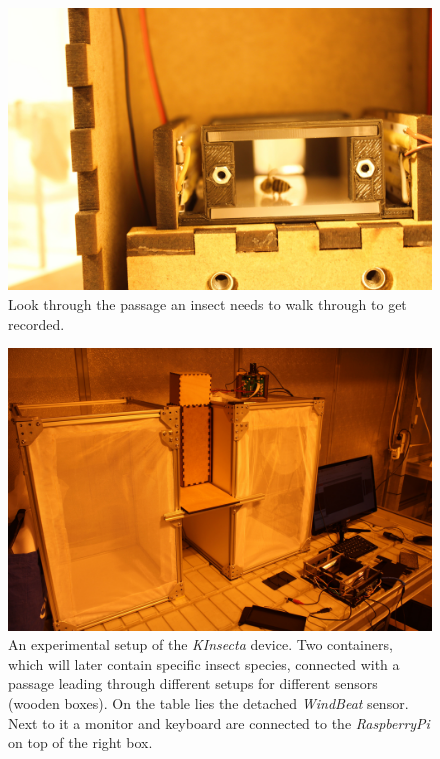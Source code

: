 \begin{figure}[!ht]
    \begin{minipage}{\textwidth}
        \centering
        \includegraphics[width=\textwidth,keepaspectratio]{src/images/camera-look-through.JPG}
        \caption{Look through the passage an insect needs to walk through to get recorded.}
        \label{fig:camera-look-through}
    \end{minipage}
\end{figure}
\begin{figure}[!ht]
    \begin{minipage}{\textwidth}
        \centering
        \includegraphics[width=\textwidth]{src/images/experimental-setup.JPG}
        \caption{An experimental setup of the \textit{KInsecta} device. Two containers, which will later contain specific insect species, connected with a passage leading through different setups for different sensors (wooden boxes). On the table lies the detached \textit{WindBeat} sensor. Next to it a monitor and keyboard are connected to the \textit{RaspberryPi} on top of the right box.}
        \label{fig:experiment-setup}
    \end{minipage}
\end{figure}

